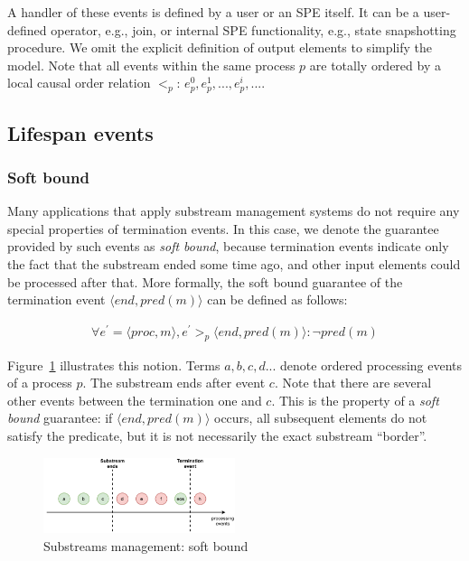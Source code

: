 A handler of these events is defined by a user or an SPE itself. It can be a user-defined operator, e.g., join, or internal SPE functionality, e.g., state snapshotting procedure. We omit the explicit definition of output elements to simplify the model. Note that all events within the same process $p$ are totally ordered by a local causal order relation $<_p$: $e^{0}_p,e^{1}_p,...,e^{i}_p,...$.

\subsection{Lifespan events}

\subsubsection{Soft bound}

Many applications that apply substream management systems do not require any special properties of termination events. In this case, we denote the guarantee provided by such events as {\em soft bound}, because termination events indicate only the fact that the substream ended some time ago, and other input elements could be processed after that. More formally, the soft bound guarantee of the termination event $\langle end, pred(m)\rangle$ can be defined as follows:

\begin{align*}
\forall e^{'} = \langle proc,m\rangle, e^{'} >_p \langle end,pred(m)\rangle : \neg pred(m)
\end{align*}

Figure~\ref{general_guarantees} illustrates this notion. Terms $a,b,c,d...$ denote ordered processing events of a process $p$. The substream ends after event $c$. Note that there are several other events between the termination one and $c$. This is the property of a {\em soft bound} guarantee: if $\langle end, pred(m)\rangle$ occurs, all subsequent elements do not satisfy the predicate, but it is not necessarily the exact substream ``border''.

\begin{figure}[htbp]
  \centering
  \includegraphics[width=0.50\textwidth]{pics/general-guarantee.pdf}
  \caption{Substreams management: soft bound}
  \label{general_guarantees}
\end{figure}

